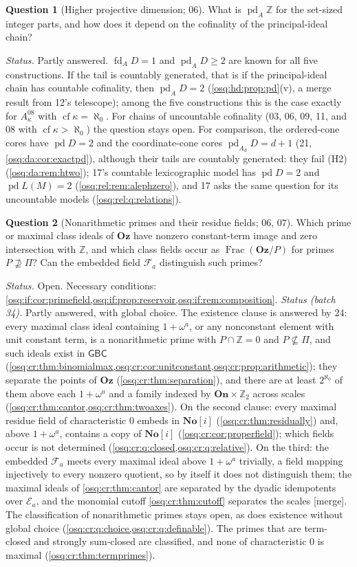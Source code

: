 \documentclass[11pt,letterpaper]{article}
\numberwithin{equation}{section}
\theoremstyle{definition}
\newtheorem{question}[question]{Question}
\theoremstyle{remark}
\theoremstyle{plain}
\newcommand{\No}{\mathbf{No}}
\newcommand{\On}{\mathbf{On}}
\newcommand{\Oz}{\mathbf{Oz}}
\newcommand{\SC}{\No[i]}
\newcommand{\Z}{\mathbb Z}
\newcommand{\FF}{\mathscr F}         %
\newcommand{\EE}{\mathscr E}         %
\newcommand{\Frac}{\operatorname{Frac}}
\newcommand{\pd}{\operatorname{pd}}
\newcommand{\fd}{\operatorname{fd}}
\newcommand{\cf}{\operatorname{cf}}
\newcommand{\merge}{\textup{\textsf{[merge]}}}
\begin{document}
\begin{question}[Higher projective dimension; 06]\label{osq:q:pd}
What is $\pd_A\Z$ for the set-sized integer parts, and how does it depend on the cofinality of the
principal-ideal chain?
\end{question}
\emph{Status.} Partly answered. $\fd_AD=1$ and $\pd_AD\ge2$ are known for all five constructions. If the tail is
countably generated, that is if the principal-ideal chain has countable cofinality, then $\pd_AD=2$
(\cref{osq:hd:prop:pd}(v), a merge result from 12's telescope); among the five constructions this is the case exactly for
$A^{08}_\kappa$ with $\cf\kappa=\aleph_0$. For chains of uncountable cofinality (03, 06, 09, 11, and 08 with
$\cf\kappa>\aleph_0$) the question stays open. For comparison, the ordered-cone cores have $\pd D=2$ and the
coordinate-cone cores $\pd_{A_d}D=d+1$ (21, \cref{osq:da:cor:exactpd}), although their tails are countably generated: they fail (H2)
(\cref{osq:da:rem:htwo}); 17's countable lexicographic model has $\pd D=2$ and
$\pd L(M)=2$ (\cref{osq:rel:rem:alephzero}), and 17 asks the same question for its uncountable models (\cref{osq:rel:q:relations}).

\begin{question}[Nonarithmetic primes and their residue fields; 06, 07]\label{osq:q:primes}
Which prime or maximal class ideals of $\Oz$ have nonzero constant-term image and zero intersection with
$\Z$, and which class fields occur as $\Frac(\Oz/P)$ for primes $P\not\supseteq\Pi$? Can the embedded
field $\FF_a$ distinguish such primes?
\end{question}
\emph{Status.} Open. Necessary conditions: \cref{osq:if:cor:primefield,osq:if:prop:reservoir,osq:if:rem:composition}.
\emph{Status (batch 34).} Partly answered, with global choice. The existence clause is answered by 24: every maximal class ideal containing
$1+\omega^a$, or any nonconstant element with unit constant term, is a nonarithmetic prime with $P\cap\Z=0$ and $P\not\subseteq\Pi$, and such ideals exist
in $\mathsf{GBC}$ (\cref{osq:cr:thm:binomialmax,osq:cr:cor:unitconstant,osq:cr:prop:arithmetic}); they separate the points of $\Oz$
(\cref{osq:cr:thm:separation}), and there are at least $2^{\aleph_0}$ of them above each $1+\omega^a$ and a family indexed by $\On\times\Z_2$ across scales
(\cref{osq:cr:thm:cantor,osq:cr:thm:twoaxes}). On the second clause: every maximal residue field of characteristic $0$ embeds in $\SC$
(\cref{osq:cr:thm:residually}) and, above $1+\omega^a$, contains a copy of $\SC$ (\cref{osq:cr:cor:properfield}); which fields occur is not determined
(\cref{osq:cr:q:closed,osq:cr:q:relative}). On the third: the embedded $\FF_a$ meets every maximal ideal above $1+\omega^a$ trivially, a field mapping injectively to every
nonzero quotient, so by itself it does not distinguish them; the maximal ideals of \cref{osq:cr:thm:cantor} are separated by the dyadic idempotents over
$\EE_a$, and the monomial cutoff \cref{osq:cr:thm:cutoff} separates the scales \merge. The classification of nonarithmetic primes stays open, as does existence without global choice (\cref{osq:cr:q:choice,osq:cr:q:definable}).
The primes that are term-closed and strongly sum-closed are classified, and none of characteristic $0$ is maximal (\cref{osq:cr:thm:termprimes}).
\end{document}
